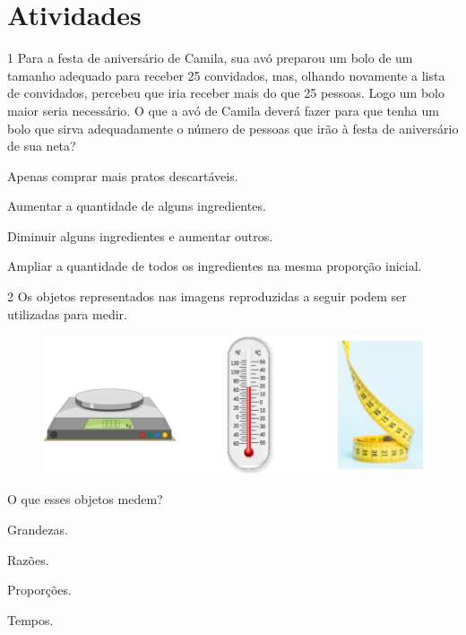 \section*{Atividades}

\num{1} Para a festa de aniversário de Camila, sua avó preparou um bolo de um
tamanho adequado para receber 25 convidados, mas, olhando novamente a
lista de convidados, percebeu que iria receber mais do que 25 pessoas. Logo um bolo maior seria necessário.
O que a avó de Camila deverá fazer para que tenha um bolo que sirva
adequadamente o número de pessoas que irão à festa de aniversário de sua
neta?

\begin{escolha}
\item
  Apenas comprar mais pratos descartáveis.
\item
  Aumentar a quantidade de alguns ingredientes.
\item
  Diminuir alguns ingredientes e aumentar outros.
\item
  Ampliar a quantidade de todos os ingredientes na mesma proporção
  inicial.
\end{escolha}


\pagebreak
\num{2} Os objetos representados nas imagens reproduzidas a seguir podem ser utilizadas para medir.

\begin{figure}[htpb!]
\centering
\includegraphics[width=\textwidth]{media/image70.png}
\end{figure}

O que esses objetos medem?

\begin{minipage}{.5\textwidth}
\begin{escolha}
\item
  Grandezas.
\item
  Razões.
\item
  Proporções.
\item
  Tempos.
\end{escolha}
\end{minipage}

